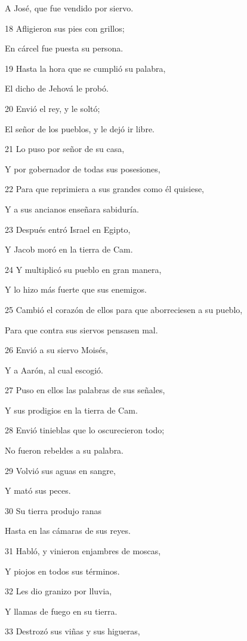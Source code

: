 \par A José, que fue vendido por siervo.
\par 18 Afligieron sus pies con grillos;
\par En cárcel fue puesta su persona.
\par 19 Hasta la hora que se cumplió su palabra,
\par El dicho de Jehová le probó.
\par 20 Envió el rey, y le soltó;
\par El señor de los pueblos, y le dejó ir libre.
\par 21 Lo puso por señor de su casa,
\par Y por gobernador de todas sus posesiones,
\par 22 Para que reprimiera a sus grandes como él quisiese,
\par Y a sus ancianos enseñara sabiduría.
\par 23 Después entró Israel en Egipto,
\par Y Jacob moró en la tierra de Cam.
\par 24 Y multiplicó su pueblo en gran manera,
\par Y lo hizo más fuerte que sus enemigos.
\par 25 Cambió el corazón de ellos para que aborreciesen a su pueblo,
\par Para que contra sus siervos pensasen mal.
\par 26 Envió a su siervo Moisés,
\par Y a Aarón, al cual escogió.
\par 27 Puso en ellos las palabras de sus señales,
\par Y sus prodigios en la tierra de Cam.
\par 28 Envió tinieblas que lo oscurecieron todo;
\par No fueron rebeldes a su palabra.
\par 29 Volvió sus aguas en sangre,
\par Y mató sus peces.
\par 30 Su tierra produjo ranas
\par Hasta en las cámaras de sus reyes.
\par 31 Habló, y vinieron enjambres de moscas,
\par Y piojos en todos sus términos.
\par 32 Les dio granizo por lluvia,
\par Y llamas de fuego en su tierra.
\par 33 Destrozó sus viñas y sus higueras,
